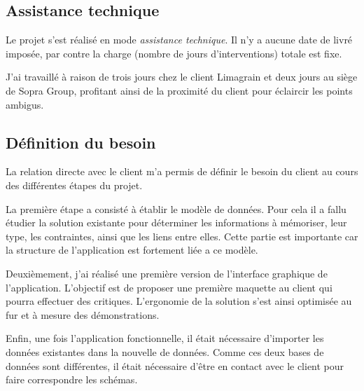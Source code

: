 \subsection{Assistance technique}


Le projet s'est réalisé en mode \textit{assistance technique}.
Il n'y a aucune date de livré imposée, par contre la charge (nombre de jours d'interventions) totale est fixe.

J'ai travaillé à raison de trois jours chez le client Limagrain et deux jours au siège de Sopra Group, profitant ainsi de la proximité du client pour éclaircir les points ambigus.


\subsection{Définition du besoin}

La relation directe avec le client m'a permis de définir le besoin du client au cours des différentes étapes du projet.

La première étape a consisté à établir le modèle de données.
Pour cela il a fallu étudier la solution existante pour déterminer les informations à mémoriser, leur type, les contraintes, ainsi que les liens entre elles.
Cette partie est importante car la structure de l'application est fortement liée a ce modèle.

Deuxièmement, j'ai réalisé une première version de l'interface graphique de l'application.
L'objectif est de proposer une première maquette au client qui pourra effectuer des critiques.
L'ergonomie de la solution s'est ainsi optimisée au fur et à mesure des démonstrations.

Enfin, une fois l'application fonctionnelle, il était nécessaire d'importer les données existantes dans la nouvelle de données.
Comme ces deux bases de données sont différentes, il était nécessaire d'être en contact avec le client pour faire correspondre les schémas.



